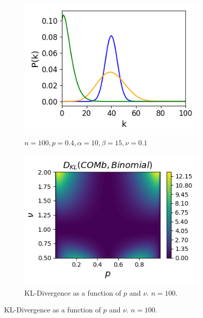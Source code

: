 \begin{figure}[p]
        \begin{subfigure}[h]{0.5\linewidth}
          \includegraphics[width=\textwidth]{figures/conway_maxwell/comb_skewed.png}
          \caption{$n=100, p=0.4, \alpha=10, \beta=15, \nu=0.1$}
          \label{fig:comb_skewed}
        \end{subfigure}
        \begin{subfigure}[h]{0.5\linewidth}
          \includegraphics[width=\textwidth]{figures/conway_maxwell/comb_bin_dkl.png}
          \caption{KL-Divergence as a function of $p$ and $\nu$. $n=100$.}
          \label{fig:comb_bin_dkl}
        \end{subfigure}

\end{figure}
